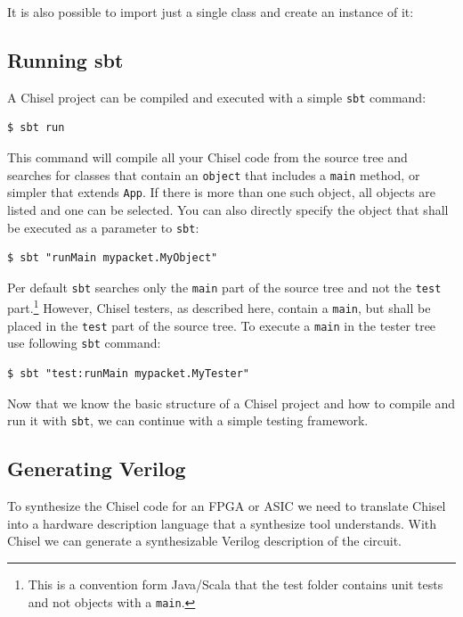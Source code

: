 \documentclass[%
    10pt,
    headinclude, footexclude,
    openright, %
    notitlepage,
    cleardoubleempty,
    headsepline,
    pointlessnumbers,
    bibtotoc, idxtotoc,
    ]{scrbook}
\newcommand{\code}[1]{{\small{\texttt{#1}}}}
\newcommand{\codefoot}[1]{{\footnotesize{\texttt{#1}}}}
\begin{document}

\noindent It is also possible to import just a single class and create an instance of it:



\subsection{Running sbt}

A Chisel project can be compiled and executed with a simple \code{sbt} command:

\begin{verbatim}
$ sbt run
\end{verbatim}

This command will compile all your Chisel code from the source tree and searches
for classes that contain an \code{object} that includes a \code{main} method, or simpler
that extends \code{App}. If there is more than one such object, all objects are listed and
one can be selected.
You can also directly specify the object that shall be executed as a parameter to \code{sbt}:

\begin{verbatim}
$ sbt "runMain mypacket.MyObject"
\end{verbatim}

Per default \code{sbt} searches only the \code{main} part of the source tree and not
the \code{test} part.\footnote{This is a convention form Java/Scala that the test folder contains
unit tests and not objects with a \codefoot{main}.} However, Chisel testers, as described here,
contain a \code{main}, but shall be placed in the \code{test} part of the source tree.
To execute a \code{main} in the tester tree use following \code{sbt} command:

\begin{verbatim}
$ sbt "test:runMain mypacket.MyTester"
\end{verbatim}

Now that we know the basic structure of a Chisel project and how to compile and run it
with \code{sbt}, we can continue with a simple testing framework.

\subsection{Generating Verilog}


To synthesize the Chisel code for an FPGA or ASIC we need to translate Chisel into
a hardware description language that a synthesize tool understands.
With Chisel we can generate a synthesizable Verilog description of the circuit.
\end{document}
